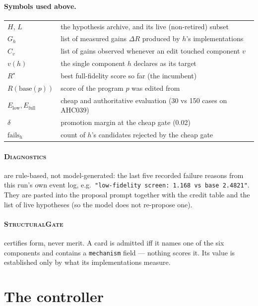 \documentclass[11pt]{article}
\begin{document}
\paragraph{Symbols used above.}
\begin{center}\small
\begin{tabular}{ll}
\toprule
$H$, $L$ & the hypothesis archive, and its live (non-retired) subset \\
$G_h$ & list of measured gains $\Delta R$ produced by $h$'s implementations \\
$C_v$ & list of gains observed whenever an edit touched component $v$ \\
$v(h)$ & the single component $h$ declares as its target \\
$R^\star$ & best full-fidelity score so far (the incumbent) \\
$R(\text{base}(p))$ & score of the program $p$ was edited from \\
$E_{\text{low}}, E_{\text{full}}$ & cheap and authoritative evaluation (30 vs 150 cases on AHC039) \\
$\delta$ & promotion margin at the cheap gate (0.02) \\
$\text{fails}_h$ & count of $h$'s candidates rejected by the cheap gate \\
\bottomrule
\end{tabular}
\end{center}

\paragraph{\textsc{Diagnostics}} are rule-based, not model-generated: the last five recorded
failure reasons from this run's own event log, e.g.\ \texttt{"low-fidelity screen: 1.168 vs base
2.4821"}. They are pasted into the proposal prompt together with the credit table and the list of
live hypotheses (so the model does not re-propose one).

\paragraph{\textsc{StructuralGate}} certifies form, never merit. A card is admitted iff it names
one of the six components and contains a \texttt{mechanism} field --- nothing scores it. Its value
is established only by what its implementations measure.

\section{The controller}
\end{document}
